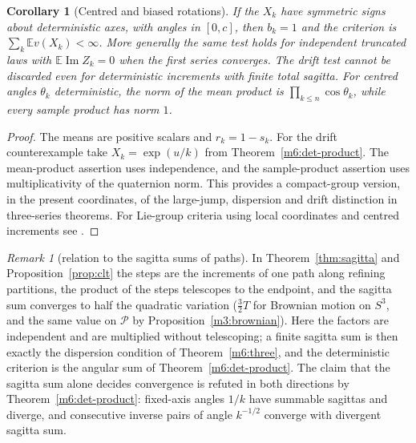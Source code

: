 \documentclass[11pt,reqno]{amsart}
\newtheorem{corollary}[theorem]{Corollary}
\theoremstyle{definition}
\theoremstyle{remark}
\newtheorem{remark}[theorem]{Remark}
\numberwithin{equation}{section}
\newcommand{\im}{\operatorname{Im}}
\begin{document}
\begin{corollary}[Centred and biased rotations]\label{m6:centered}
If the \(X_k\) have symmetric signs about deterministic axes, with
angles in \([0,c]\), then \(b_k=1\) and the criterion is
\(\sum_k\mathbb E v(X_k)<\infty\). More generally the same test
holds for independent truncated laws with \(\mathbb E\im Z_k=0\)
when the first series converges. The drift test cannot be
discarded even for deterministic increments with finite total
sagitta. For centred angles \(\theta_k\) deterministic, the
norm of the mean product is \(\prod_{k\le n}\cos\theta_k\), while
every sample product has norm \(1\).
\end{corollary}
\begin{proof}
The means are positive scalars and \(r_k=1-s_k\).
For the drift counterexample take \(X_k=\exp(u/k)\)
from Theorem~\ref{m6:det-product}. The mean-product assertion
uses independence, and the sample-product assertion uses
multiplicativity of the quaternion norm. This provides a
compact-group version, in the present coordinates, of the
large-jump, dispersion and drift distinction in
three-series theorems. For Lie-group criteria using local
coordinates and centred increments see \cite{m6:Liao}.
\end{proof}

\begin{remark}[relation to the sagitta sums of paths]\label{m6:sagitta-link}
In Theorem~\ref{thm:sagitta} and Proposition~\ref{prop:clt} the steps are the increments of one path along refining partitions, the
product of the steps telescopes to the endpoint, and the sagitta sum converges to half the quadratic variation ($\tfrac32T$ for
Brownian motion on $S^3$, and the same value on $\mathcal P$ by Proposition~\ref{m3:brownian}).  Here the factors are independent and
are multiplied without telescoping; a finite sagitta sum is then exactly the dispersion condition of Theorem~\ref{m6:three}, and the
deterministic criterion is the angular sum of Theorem~\ref{m6:det-product}.  The claim that the sagitta sum alone decides convergence
is refuted in both directions by Theorem~\ref{m6:det-product}: fixed-axis angles $1/k$ have summable sagittas and diverge, and
consecutive inverse pairs of angle $k^{-1/2}$ converge with divergent sagitta sum.
\end{remark}
\end{document}
